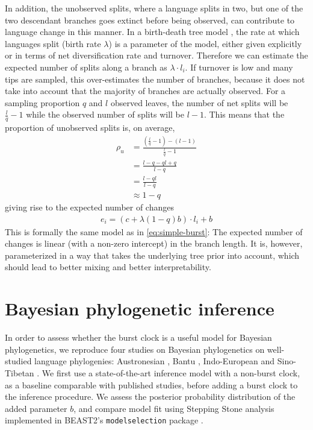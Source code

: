 \documentclass[a4paper,12pt]{scrartcl}
\begin{document}
In addition, the unobserved splits, where a language splits in two, but one of
the two descendant branches goes extinct before being observed, can contribute
to language change in this manner. In a birth-death tree model \parencite{}, the rate at which
languages split (birth rate $\lambda$) is a parameter of the model, either given explicitly or in terms of net diversification rate and turnover. Therefore
we can estimate the expected number of splits along a branch as $\lambda \cdot
l_i$. If turnover is low and many tips are sampled, this over-estimates the number of branches, because it does not take into account that the majority of branches are actually observed. For a sampling proportion $q$ and $l$ observed leaves, the number of net splits will be
$\frac{l}{q} - 1$
while the observed number of splits will be $l - 1$. This means that the proportion of unobserved splits is, on average,
\begin{align}
    \rho_u &= \frac{(\frac{l}{q} - 1) - (l - 1)}{\frac{l}{q} -1} \\
    & = \frac{l - q - ql + q}{l - q} \\
    & = \frac{l - ql}{l - q} \\
    & \approx 1 - q
\end{align}
giving rise to the expected number of changes
\begin{align}
  e_i = (c + \lambda (1-q) b) \cdot l_i + b
  \label{eq:reparam-burst}
\end{align}
This is formally the same model as in \cref{eq:simple-burst}: The expected number of changes is linear (with a non-zero intercept) in the branch length. It is, however, parameterized
in a way that takes the underlying tree prior into account,
which should lead to better mixing and better interpretability.

\section{Bayesian phylogenetic inference}

In order to assess whether the burst clock is a useful model for Bayesian phylogenetics, we reproduce four studies on
Bayesian phylogenetics on well-studied language phylogenies: Austronesian \parencite{}, Bantu \parencite{}, Indo-European
\parencite{} and Sino-Tibetan \parencite{}. We first use a state-of-the-art inference model with a non-burst clock, as a
baseline comparable with published studies, before adding a burst clock to the inference procedure. We assess the posterior
probability distribution of the added parameter $b$, and compare model fit using Stepping Stone analysis implemented in BEAST2's
\texttt{modelselection} package \parencite{}.
\end{document}
